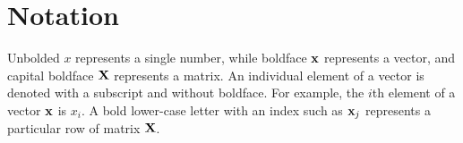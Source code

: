 
\inbpdocument

\chapter*{Notation}
\label{ch:notation}


Unbolded $x$ represents a single number, while boldface ${\bf{x}}$ represents a vector, and capital boldface $\mathbf{X}$ represents a matrix.
An individual element of a vector is denoted with a subscript and without boldface.
For example, the $i$th element of a vector ${\bf{x}}$ is $x_i$.
A bold lower-case letter with an index such as ${\bf{x}}_j$ represents a particular row of matrix $\mathbf{X}$.

\vspace{1cm}

